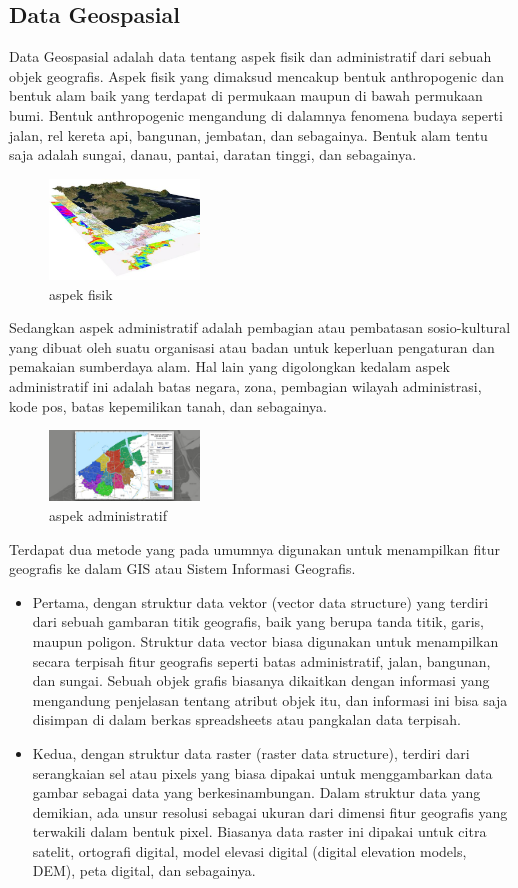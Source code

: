 \subsection{Data Geospasial}
Data Geospasial adalah data tentang aspek fisik dan administratif dari sebuah objek geografis.\hfill\break
Aspek fisik yang dimaksud mencakup bentuk anthropogenic dan bentuk alam baik yang terdapat di permukaan maupun di bawah permukaan bumi. Bentuk anthropogenic mengandung di dalamnya fenomena budaya seperti jalan, rel kereta api, bangunan, jembatan, dan sebagainya. Bentuk alam tentu saja adalah sungai, danau, pantai, daratan tinggi, dan sebagainya. \hfill\break
\begin{figure}[H]
	\includegraphics[width=4cm]{figures/1174096/1/consult_3.jpg}
	\centering
	\caption{aspek fisik}
\end{figure}
Sedangkan aspek administratif adalah pembagian atau pembatasan sosio-kultural yang dibuat oleh suatu organisasi atau badan untuk keperluan pengaturan dan pemakaian sumberdaya alam. Hal lain yang digolongkan kedalam aspek administratif ini adalah batas negara, zona, pembagian wilayah administrasi, kode pos, batas kepemilikan tanah, dan sebagainya.\hfill\break
\begin{figure}[H]
	\includegraphics[width=4cm]{figures/1174096/1/PETA.jpg}
	\centering
	\caption{aspek administratif}
\end{figure}
Terdapat dua metode yang pada umumnya digunakan untuk menampilkan fitur geografis ke dalam GIS atau Sistem Informasi Geografis.\hfill\break 
\begin{itemize}
	\item Pertama, dengan struktur data vektor (vector data structure) yang terdiri dari sebuah gambaran titik geografis, baik yang berupa tanda titik, garis, maupun poligon. Struktur data vector biasa digunakan untuk menampilkan secara terpisah fitur geografis seperti batas administratif, jalan, bangunan, dan sungai. Sebuah objek grafis biasanya dikaitkan dengan informasi yang mengandung penjelasan tentang atribut objek itu, dan informasi ini bisa saja disimpan di dalam berkas spreadsheets atau pangkalan data terpisah.\hfill\break
	\item Kedua, dengan struktur data raster (raster data structure), terdiri dari serangkaian sel atau pixels yang biasa dipakai untuk menggambarkan data gambar sebagai data yang berkesinambungan. Dalam struktur data yang demikian, ada unsur resolusi sebagai ukuran dari dimensi fitur geografis yang terwakili dalam bentuk pixel. Biasanya data raster ini dipakai untuk citra satelit, ortografi digital, model elevasi digital (digital elevation models, DEM), peta digital, dan sebagainya.
\end{itemize}
